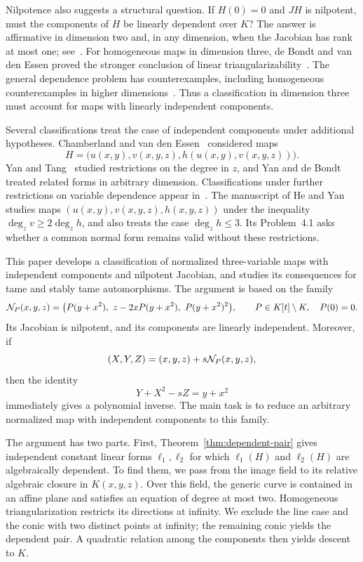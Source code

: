 Nilpotence also suggests a structural question. If $H(0)=0$ and $JH$ is nilpotent, must the components of $H$ be linearly dependent over $K$? The answer is affirmative in dimension two and, in any dimension, when the Jacobian has rank at most one; see~\cite{BCW,deBondtYan2014}. For homogeneous maps in dimension three, de Bondt and van den Essen proved the stronger conclusion of linear triangularizability~\cite{deBondtEssen}. The general dependence problem has counterexamples, including homogeneous counterexamples in higher dimensions~\cite{deBondt2006}. Thus a classification in dimension three must account for maps with linearly independent components.

Several classifications treat the case of independent components under additional hypotheses. Chamberland and van den Essen~\cite{ChamberlandEssen} considered maps
\[
 H=\bigl(u(x,y),v(x,y,z),h(u(x,y),v(x,y,z))\bigr).
\]
Yan and Tang~\cite{YanTang} studied restrictions on the degree in $z$, and Yan and de Bondt~\cite{YanBondt2019} treated related forms in arbitrary dimension. Classifications under further restrictions on variable dependence appear in~\cite{CastanedaEssen,Yan2022}. The manuscript of He and Yan~\cite{HeYan} studies maps $(u(x,y),v(x,y,z),h(x,y,z))$ under the inequality $\deg_zv\geq2\deg_zh$, and also treats the case $\deg_zh\leq3$. Its Problem~4.1 asks whether a common normal form remains valid without these restrictions.

This paper develops a classification of normalized three-variable maps with independent components and nilpotent Jacobian, and studies its consequences for tame and stably tame automorphisms. The argument is based on the family
\begin{equation}\label{eq:canonical-intro}
 \mathcal N_P(x,y,z)=\bigl(P(y+x^2),\ z-2xP(y+x^2),\ P(y+x^2)^2\bigr),
 \qquad P\in K[t]\setminus K,\quad P(0)=0.
\end{equation}
Its Jacobian is nilpotent, and its components are linearly independent. Moreover, if
\[
 (X,Y,Z)=(x,y,z)+s\mathcal N_P(x,y,z),
\]
then the identity
\begin{equation}\label{eq:intro-invariant}
 Y+X^2-sZ=y+x^2
\end{equation}
immediately gives a polynomial inverse. The main task is to reduce an arbitrary normalized map with independent components to this family.

The argument has two parts. First, Theorem~\ref{thm:dependent-pair} gives independent constant linear forms $\ell_1,\ell_2$ for which $\ell_1(H)$ and $\ell_2(H)$ are algebraically dependent. To find them, we pass from the image field to its relative algebraic closure in $K(x,y,z)$. Over this field, the generic curve is contained in an affine plane and satisfies an equation of degree at most two. Homogeneous triangularization restricts its directions at infinity. We exclude the line case and the conic with two distinct points at infinity; the remaining conic yields the dependent pair. A quadratic relation among the components then yields descent to $K$.

